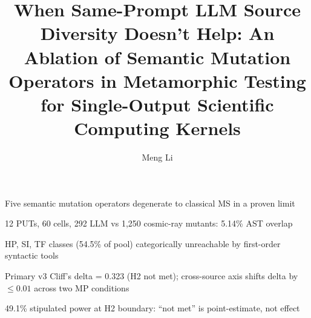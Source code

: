 \documentclass[review,12pt,authoryear]{elsarticle}
\begin{document}
\begin{frontmatter}

\title{When Same-Prompt LLM Source Diversity Doesn't Help: An Ablation of Semantic Mutation Operators in Metamorphic Testing for Single-Output Scientific Computing Kernels}

\author[a]{Meng Li}


\begin{highlights}
\item Five semantic mutation operators degenerate to classical MS in a proven limit
\item 12 PUTs, 60 cells, 292 LLM vs 1,250 cosmic-ray mutants: 5.14\% AST overlap
\item HP, SI, TF classes (54.5\% of pool) categorically unreachable by first-order syntactic tools
\item Primary v3 Cliff's delta = 0.323 (H2 not met); cross-source axis shifts delta by $\leq 0.01$ across two MP conditions
\item 49.1\% stipulated power at H2 boundary: ``not met'' is point-estimate, not effect
\end{highlights}


\end{frontmatter}
\end{document}
